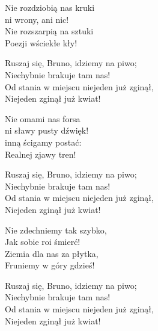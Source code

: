 \begin{text}
    Nie rozdziobią nas kruki\\
    ni wrony, ani nic!\\
    Nie rozszarpią na sztuki\\
    Poezji wściekłe kły!

    Ruszaj się, Bruno, idziemy na piwo;\\
    Niechybnie brakuje tam nas!\\
    Od stania w miejscu niejeden już zginął,\\
    Niejeden zginął już kwiat!

    Nie omami nas forsa\\
    ni sławy pusty dźwięk!\\
    inną ścigamy postać:\\
    Realnej zjawy tren!

    Ruszaj się, Bruno, idziemy na piwo;\\
    Niechybnie brakuje tam nas!\\
    Od stania w miejscu niejeden już zginął,\\
    Niejeden zginął już kwiat!

    Nie zdechniemy tak szybko,\\
    Jak sobie roi śmierć!\\
    Ziemia dla nas za płytka,\\
    Fruniemy w góry gdzieś!

    Ruszaj się, Bruno, idziemy na piwo;\\
    Niechybnie brakuje tam nas!\\
    Od stania w miejscu niejeden już zginął,\\
    Niejeden zginął już kwiat!
\end{text}
\begin{chord}

\end{chord}